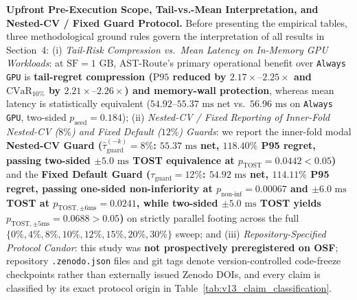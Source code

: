 \documentclass[10pt,a4paper]{article}
\begin{document}
\par\vspace{3pt}\noindent\textbf{Upfront Pre-Execution Scope, Tail-vs.-Mean Interpretation, and Nested-CV / Fixed Guard Protocol.} Before presenting the empirical tables, three methodological ground rules govern the interpretation of all results in Section~4: (i) \emph{Tail-Risk Compression vs.\ Mean Latency on In-Memory GPU Workloads}: at $\text{SF}=1\text{ GB}$, AST-Route's primary operational benefit over \texttt{Always GPU} is \textbf{tail-regret compression ($\text{P95}$ reduced by $2.17\times\text{--}2.25\times$ and $\text{CVaR}_{10\%}$ by $2.21\times\text{--}2.26\times$) and memory-wall protection}, whereas mean latency is statistically equivalent ($54.92\text{--}55.37\text{ ms}$ net vs.\ $56.96\text{ ms}$ on \texttt{Always GPU}, two-sided $p_{\text{seed}}=0.184$); (ii) \emph{Nested-CV / Fixed Reporting of Inner-Fold Nested-CV ($8\%$) and Fixed Default ($12\%$) Guards}: we report the inner-fold modal \textbf{Nested-CV Guard ($\hat{\tau}_{\text{guard}}^{(-k)}=8\%$: $55.37\text{ ms}$ net, $118.40\%$ P95 regret, passing two-sided $\pm 5.0\text{ ms}$ TOST equivalence at $p_{\text{TOST}}=0.0442 < 0.05$)} and the \textbf{Fixed Default Guard ($\tau_{\text{guard}}=12\%$: $54.92\text{ ms}$ net, $114.11\%$ P95 regret, passing one-sided non-inferiority at $p_{\text{non-inf}}=0.00067$ and $\pm 6.0\text{ ms}$ TOST at $p_{\text{TOST},\pm 6\text{ms}}=0.0241$, while two-sided $\pm 5.0\text{ ms}$ TOST yields $p_{\text{TOST},\pm 5\text{ms}}=0.0688 > 0.05$)} on strictly parallel footing across the full $\{0\%,4\%,8\%,10\%,12\%,15\%,20\%,30\%\}$ sweep; and (iii) \emph{Repository-Specified Protocol Candor}: this study was \textbf{not prospectively preregistered on OSF}; repository \texttt{.zenodo.json} files and git tags denote version-controlled code-freeze checkpoints rather than externally issued Zenodo DOIs, and every claim is classified by its exact protocol origin in Table~\ref{tab:v13_claim_classification}.
\end{document}

